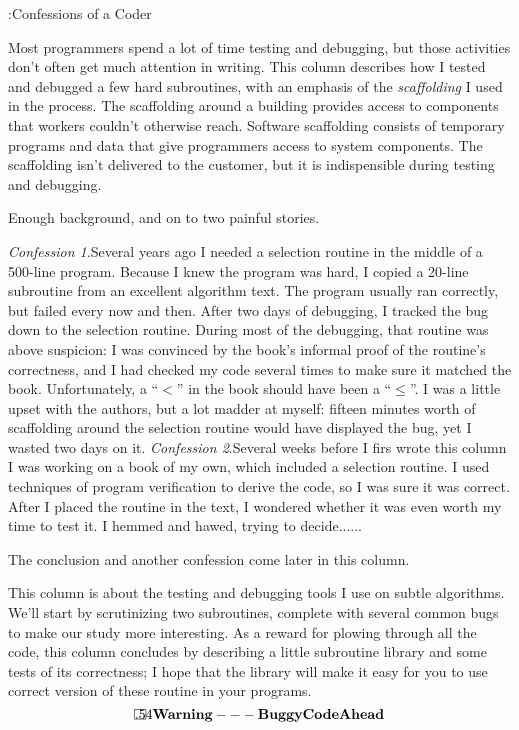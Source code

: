 %



:Confessions of a Coder

\noindent
Most programmers spend a lot of time testing and debugging, but those activities
don't often get much attention in writing. This column describes how I tested
and debugged a few hard subroutines, with an emphasis of the {\it scaffolding\/}
I used in the process. The scaffolding around a building provides access to
components that workers couldn't otherwise reach. Software scaffolding consists
of temporary programs and data that give programmers access to system
components. The scaffolding isn't delivered to the customer, but it is
indispensible during testing and debugging.

Enough background, and on to two painful stories.

\medskip
\more
{\it Confession 1\/}.\enspace Several years ago I needed a selection routine in
the middle of a 500-line program. Because I knew the program was hard, I copied
a 20-line subroutine from an excellent algorithm text. The program usually
ran correctly, but failed every now and then. After two days of debugging, I
tracked the bug down to the selection routine. During most of the debugging,
that routine was above suspicion: I was convinced by the book's informal proof
of the routine's correctness, and I had checked my code several times to make
sure it matched the book. Unfortunately, a ``$<$'' in the book should have been
a ``$\le$''. I was a little upset with the authors, but a lot madder at myself:
fifteen minutes worth of scaffolding around the selection routine would have
displayed the bug, yet I wasted two days on it.
\smallskip\more
{\it Confession 2\/}.\enspace Several weeks before I firs wrote this column I
was working on a book of my own, which included a selection routine. I used
techniques of program verification to derive the code, so I was sure it
was correct. After I placed the routine in the text, I wondered whether it was
even worth my time to test it. I hemmed and hawed, trying to decide......
\medskip
  
\noindent The conclusion and another confession come later in this column.

This column is about the testing and debugging tools I use on subtle
algorithms. We'll start by scrutinizing two subroutines, complete with several
common bugs to make our study more interesting. As a reward for plowing through
all the code, this column concludes by describing a little subroutine library
and some tests of its correctness; I hope that the library will make it easy
for you to use correct version of these routine in your programs.
$$
\frame{.5}{4}{\bf Warning --- Buggy Code Ahead}
$$

